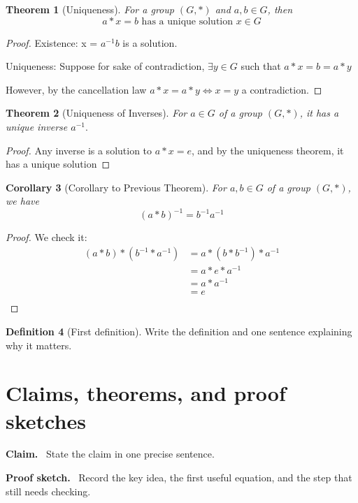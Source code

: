 \documentclass[11pt]{article}
\newcommand{\1}{\mathbf{1}}
\theoremstyle{notestyle}
\newtheorem{theorem}{Theorem}[section]
\newtheorem{corollary}[theorem]{Corollary}
\theoremstyle{definition}
\newtheorem{definition}[theorem]{Definition}
\newenvironment{claim}{\par\noindent\textbf{Claim.}\ }{\par}
\newenvironment{proofsketch}{\par\noindent\textbf{Proof sketch.}\ }{\par}
\begin{document}
\begin{theorem}[Uniqueness]
\label{thm:label}
For a group $(G, *)$ and $a, b \in G$, then $$a * x = b \text{ has a unique solution } x\in G$$
\end{theorem}
\begin{proof}
Existence: x = $a^{-1}b$ is a solution.
\par Uniqueness: Suppose for sake of contradiction, $\exists y \in G$ such that $a * x =
b = a * y$ \par However, by the cancellation law $a * x = a * y \iff x = y$ a contradiction.
\end{proof}
\begin{theorem}[Uniqueness of Inverses]
\label{thm:label}
For $a \in G$ of a group $(G,*)$, it has a unique inverse $a^{-1}.$
\end{theorem}
\begin{proof}
Any inverse is a solution to $a * x = e$, and by the uniqueness theorem, it has a unique
solution
\end{proof}
\begin{corollary}[Corollary to Previous Theorem]
\label{cor:label}
For $a, b \in G$ of a group $(G, *)$, we have $$(a * b)^{-1} = b^{-1} a^{-1}$$
\end{corollary}
\begin{proof}
We check it: 
\begin{align*}
    (a * b) * (b^{-1} * a^{-1})
        &= a * (b * b^{-1}) * a^{-1} \\
        &= a * e * a^{-1} \\
    &= a * a^{-1} \\
    &= e\\
\end{align*}

\end{proof}
\begin{definition}[First definition]
Write the definition and one sentence explaining why it matters.
\end{definition}

\section{Claims, theorems, and proof sketches}
\begin{claim}
State the claim in one precise sentence.
\end{claim}

\begin{proofsketch}
Record the key idea, the first useful equation, and the step that still needs checking.
\end{proofsketch}
\end{document}
